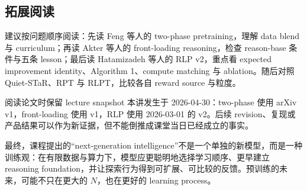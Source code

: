 \documentclass[a4paper]{article}
\begin{document}
\subsection{拓展阅读}

建议按问题顺序阅读：先读 Feng 等人的 two-phase pretraining，理解 data blend 与 curriculum；再读 Akter 等人的 front-loading reasoning，检查 reason-base 条件与五条 lesson；最后读 Hatamizadeh 等人的 RLP v2，重点看 expected improvement identity、Algorithm 1、compute matching 与 ablation。随后对照 Quiet-STaR、RPT 与 RLPT，比较各自 reward source 与粒度。

\begin{warningbox}{阅读论文时保留 lecture snapshot}
本讲发生于 2026-04-30：two-phase 使用 arXiv v1，front-loading 使用 v1，RLP 使用 2026-03-01 的 v2。后续 revision、复现或产品结果可以作为新证据，但不能倒推成课堂当日已经成立的事实。
\end{warningbox}

最终，课程提出的“next-generation intelligence”不是一个单独的新模型，而是一种训练观：在有限数据与算力下，模型应更聪明地选择学习顺序、更早建立 reasoning foundation，并让探索行为得到可扩展、可比较的反馈。预训练的未来，可能不只在更大的 $N$，也在更好的 learning process。
\end{document}

